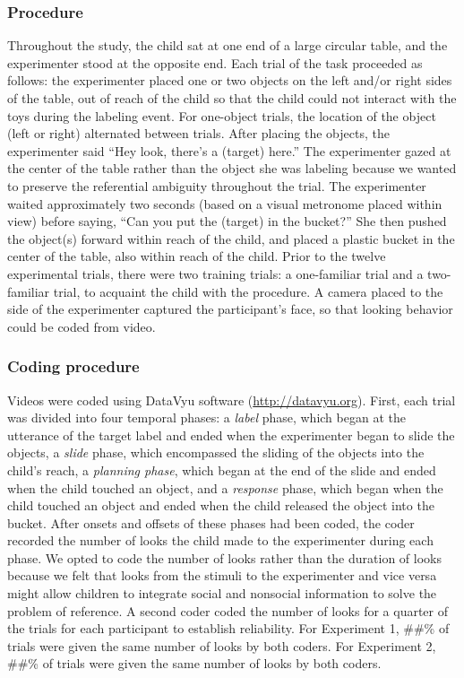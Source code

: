 \documentclass[10pt, letterpaper]{article}
\begin{document}
\subsubsection{Procedure}\label{procedure}

Throughout the study, the child sat at one end of a large circular
table, and the experimenter stood at the opposite end. Each trial of the
task proceeded as follows: the experimenter placed one or two objects on
the left and/or right sides of the table, out of reach of the child so
that the child could not interact with the toys during the labeling
event. For one-object trials, the location of the object (left or right)
alternated between trials. After placing the objects, the experimenter
said ``Hey look, there's a (target) here.'' The experimenter gazed at
the center of the table rather than the object she was labeling because
we wanted to preserve the referential ambiguity throughout the trial.
The experimenter waited approximately two seconds (based on a visual
metronome placed within view) before saying, ``Can you put the (target)
in the bucket?'' She then pushed the object(s) forward within reach of
the child, and placed a plastic bucket in the center of the table, also
within reach of the child. Prior to the twelve experimental trials,
there were two training trials: a one-familiar trial and a two-familiar
trial, to acquaint the child with the procedure. A camera placed to the
side of the experimenter captured the participant's face, so that
looking behavior could be coded from video.

\subsubsection{Coding procedure}\label{coding-procedure}

Videos were coded using DataVyu software (\url{http://datavyu.org}).
First, each trial was divided into four temporal phases: a \emph{label}
phase, which began at the utterance of the target label and ended when
the experimenter began to slide the objects, a \emph{slide} phase, which
encompassed the sliding of the objects into the child's reach, a
\emph{planning phase}, which began at the end of the slide and ended
when the child touched an object, and a \emph{response} phase, which
began when the child touched an object and ended when the child released
the object into the bucket. After onsets and offsets of these phases had
been coded, the coder recorded the number of looks the child made to the
experimenter during each phase. We opted to code the number of looks
rather than the duration of looks because we felt that looks from the
stimuli to the experimenter and vice versa might allow children to
integrate social and nonsocial information to solve the problem of
reference. A second coder coded the number of looks for a quarter of the
trials for each participant to establish reliability. For Experiment 1,
\#\#\% of trials were given the same number of looks by both coders. For
Experiment 2, \#\#\% of trials were given the same number of looks by
both coders.
\end{document}
